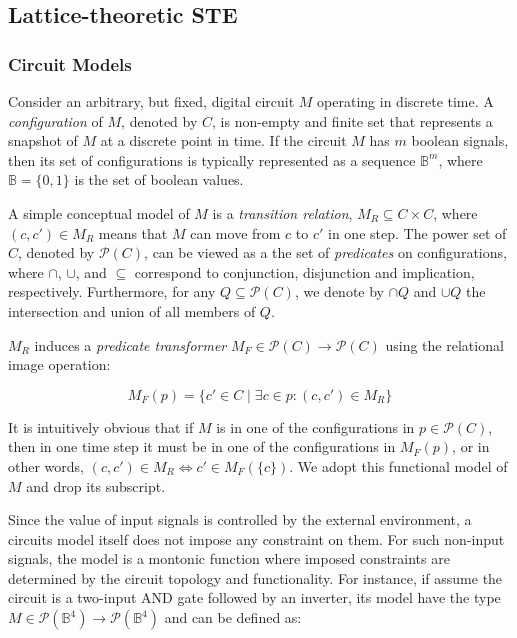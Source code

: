 \subsection{Lattice-theoretic STE}

\subsubsection{Circuit Models}

Consider an arbitrary, but fixed, digital circuit $M$ operating in discrete time. A \textit{configuration} of $M$, denoted by $C$, is non-empty and finite set that represents a snapshot of $M$ at a discrete point in time. If the circuit $M$ has $m$ boolean signals, then its set of configurations is typically represented as a sequence $\mathbb{B}^{m}$, where $\mathbb{B} = \{ 0,1 \}$ is the set of boolean values.

A simple conceptual model of $M$ is a \textit{transition relation}, $M_{R} \subseteq C \times C$, where $(c,c') \in M_{R}$ means that $M$ can move from $c$ to $c'$ in one step\footnotemark. The power set of $C$, denoted by $\mathcal{P}(C)$, can be viewed as a the set of \textit{predicates} on configurations, where $\cap$, $\cup$, and $\subseteq$ correspond to conjunction, disjunction and implication, respectively. Furthermore, for any $Q \subseteq \mathcal{P}(C)$, we denote by $\cap Q$ and $\cup Q$ the intersection and union of all members of $Q$.

\footnotetext{\textcolor{red}{Mention how this affects circuits with zero-delays?}}

$M_{R}$ induces a \textit{predicate transformer} $M_{F} \in \mathcal{P}(C) \rightarrow \mathcal{P}(C)$ using the relational image operation:

\begin{equation*}
M_{F}(p) = \{ c' \in C \mid \exists c \in p : (c,c') \in M_{R} \}
\end{equation*}

\noindent It is intuitively obvious that if $M$ is in one of the configurations in $p \in \mathcal{P}(C)$, then in one time step it must be in one of the configurations in $M_{F}(p)$, or in other words, $(c,c') \in M_{R} \iff c' \in M_{F}(\{ c \})$. We adopt this functional model of $M$ and drop its subscript.

Since the value of input signals is controlled by the external environment, a circuits model itself does not impose any constraint on them. For such non-input signals, the model is a montonic function where imposed constraints are determined by the circuit topology and functionality. For instance, if assume the circuit is a two-input AND gate followed by an inverter, its model have the type $M \in \mathcal{P}(\mathbb{B}^{4}) \rightarrow \mathcal{P}(\mathbb{B}^{4})$ and can be defined as:

